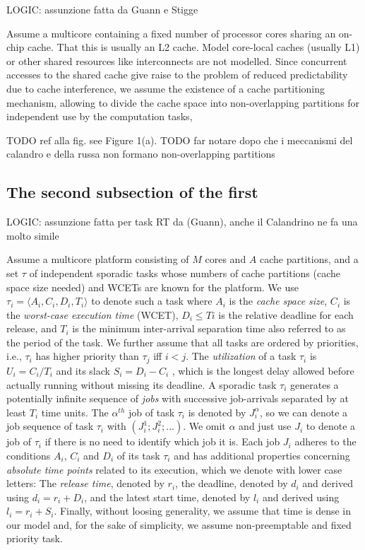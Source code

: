 \documentclass[a4paper,10pt]{article}
\begin{document}
\begin{multicols}{2}
LOGIC: assunzione fatta da Guann e Stigge

Assume a multicore containing a fixed number of processor cores sharing an on-chip cache. That this is usually an L2 cache. Model core-local caches 
(usually L1) or other shared resources like interconnects are not modelled. Since concurrent accesses to the shared 
cache give raise to the problem of reduced predictability due to cache interference, we assume the existence of a cache partitioning 
mechanism, allowing to divide the cache space into non-overlapping partitions for independent use by the computation tasks, 

TODO ref alla fig. see Figure 1(a).
TODO far notare dopo che i meccanismi del calandro e della russa non formano non-overlapping partitions

\subsection{The second subsection of the first}

LOGIC: assunzione fatta per task RT da (Guann), anche il Calandrino ne fa una molto simile

Assume a multicore platform consisting of $M$ cores and $A$ cache partitions, and a set $\tau$ of independent sporadic tasks
whose numbers of cache partitions (cache space size needed) and WCETs are known for the platform. We use $\tau_i = \langle A_i,C_i,D_i,T_i \rangle$
to denote such a task where $A_i$ is the \textit{cache space size}, $C_i$ is the \textit{worst-case execution time} (WCET), $D_i \le Ti$ is the 
relative deadline for each release, and $T_i$ is the minimum inter-arrival separation time also referred to as the period of the task. We further assume
that all tasks are ordered by priorities, i.e., $\tau_i$ has higher priority than $\tau_j$ iff $i < j$. The \textit{utilization} of a task $\tau_i$ is
$U_i = C_i/T_i$ and its slack $S_i = D_i - C_i$ , which is the longest delay allowed before actually running without missing its
deadline. A sporadic task $\tau_i$ generates a potentially infinite sequence of \textit{jobs} with successive job-arrivals separated by at least $T_i$
time units. The $\alpha^{th}$ job of task $\tau_i$ is denoted by $J_{i}^\alpha$, so we can denote a job sequence of task $\tau_i$
with $(J_{i}^1; J_{i}^2;\dots{})$. We omit $\alpha$ and just use $J_i$ to denote a job of $\tau_i$ if there is no need to identify which job it is. Each
job $J_i$ adheres to the conditions $A_i$, $C_i$ and $D_i$ of its task $\tau_i$ and has additional properties concerning \textit{absolute time points} 
related to its execution, which we denote with lower case letters: The \textit{release time}, denoted by $r_i$, the deadline, denoted by $d_i$
and derived using $d_i = r_i + D_i$, and the latest start time, denoted by $l_i$ and derived using $l_i = r_i + S_i$.
Finally, without loosing generality, we assume that time is dense in our model and, for the sake of simplicity, we assume non-preemptable and fixed priority
task. 


\end{multicols}
\end{document}
